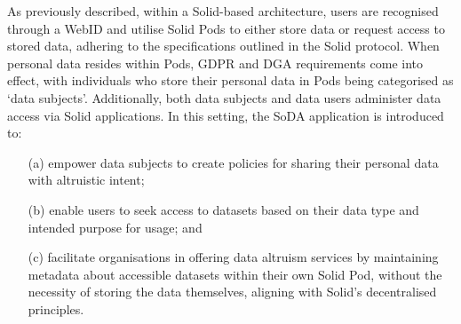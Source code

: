 As previously described, within a Solid-based architecture, users are recognised through a WebID and utilise Solid Pods to either store data or request access to stored data, adhering to the specifications outlined in the Solid protocol.
When personal data resides within Pods, GDPR and DGA requirements come into effect, with individuals who store their personal data in Pods being categorised as `data subjects'.
Additionally, both data subjects and data users administer data access via Solid applications.
In this setting, the SoDA application is introduced to:

\begin{enumerate}
    \item [(a)] empower data subjects to create policies for sharing their personal data with altruistic intent;
    \item [(b)] enable users to seek access to datasets based on their data type and intended purpose for usage; and
    \item [(c)] facilitate organisations in offering data altruism services by maintaining metadata about accessible datasets within their own Solid Pod, without the necessity of storing the data themselves, aligning with Solid's decentralised principles.
\end{enumerate}
